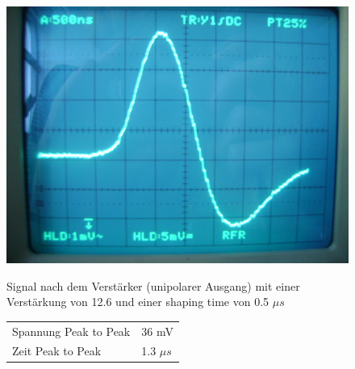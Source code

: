 \begin{figure}[H]
\begin{minipage}{0.4\textwidth}
\centering \includegraphics[width = \textwidth]{messergebnisse/2.JPG}
\end{minipage}
\begin{minipage}{0.6\textwidth}
Signal nach dem Verstärker (unipolarer Ausgang) mit einer Verstärkung von 12.6 und einer shaping time von 0.5 $\mu s$

\centering \begin{tabular}{l l}
Spannung Peak to Peak & 36 mV\\
Zeit Peak to Peak & 1.3 $\mu s$
\end{tabular}
\end{minipage}
\end{figure}

\clearpage %

